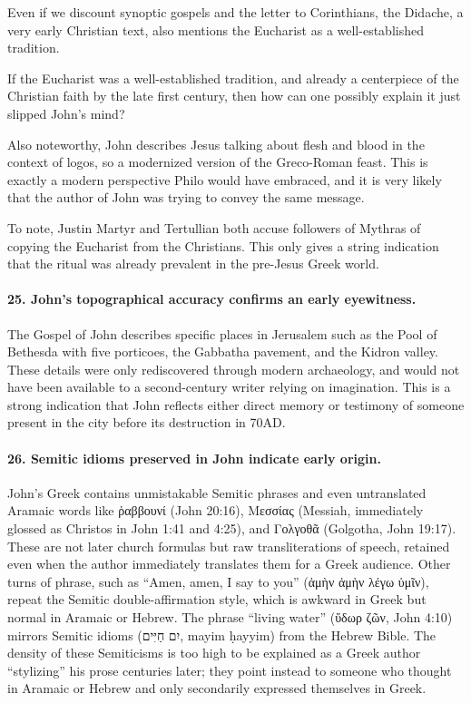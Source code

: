 Even if we discount synoptic gospels and the letter to Corinthians, the Didache, a very early Christian text, also mentions the Eucharist as a well-established tradition.

If the Eucharist was a well-established tradition, and already a centerpiece of the Christian faith by the late first century, then how can one possibly explain it just slipped John's mind?

Also noteworthy, John describes Jesus talking about flesh and blood in the context of logos, so a modernized version of the Greco-Roman feast.
This is exactly a modern perspective Philo would have embraced, and it is very likely that the author of John was trying to convey the same message.

To note, Justin Martyr and Tertullian both accuse followers of Mythras of copying the Eucharist from the Christians.
This only gives a string indication that the ritual was already prevalent in the pre-Jesus Greek world.

\paragraph{25.
John’s topographical accuracy confirms an early eyewitness.}\label{par:johns-topographical-accuracy-confirms-an-early-eyewitness.}

The Gospel of John describes specific places in Jerusalem such as the Pool of Bethesda with five porticoes, the Gabbatha pavement, and the Kidron valley.
These details were only rediscovered through modern archaeology, and would not have been available to a second-century writer relying on imagination.
This is a strong indication that John reflects either direct memory or testimony of someone present in the city before its destruction in 70AD.

\paragraph{26.
Semitic idioms preserved in John indicate early origin.}\label{par:semitic-idioms-preserved-in-john-indicate-early-origin.}

John’s Greek contains unmistakable Semitic phrases and even untranslated Aramaic words like ῥαββουνί (John 20:16), Μεσσίας (Messiah, immediately glossed as Christos in John 1:41 and 4:25), and Γολγοθᾶ (Golgotha, John 19:17).
These are not later church formulas but raw transliterations of speech, retained even when the author immediately translates them for a Greek audience.
Other turns of phrase, such as “Amen, amen, I say to you” (ἀμὴν ἀμὴν λέγω ὑμῖν), repeat the Semitic double-affirmation style, which is awkward in Greek but normal in Aramaic or Hebrew.
The phrase “living water” (ὕδωρ ζῶν, John 4:10) mirrors Semitic idioms (\texthebrew{יִם חַיִּים}, mayim ḥayyim) from the Hebrew Bible.
The density of these Semiticisms is too high to be explained as a Greek author “stylizing” his prose centuries later; they point instead to someone who thought in Aramaic or Hebrew and only secondarily expressed themselves in Greek.

